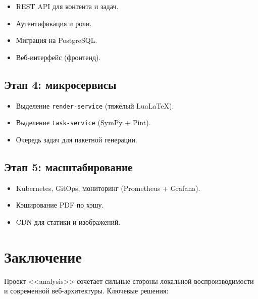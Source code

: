 \documentclass[12pt,a4paper]{article}
\newcommand{\code}[1]{\texttt{#1}}
\begin{document}
\begin{itemize}
    \item REST API для контента и задач.
    \item Аутентификация и роли.
    \item Миграция на PostgreSQL.
    \item Веб-интерфейс (фронтенд).
\end{itemize}

\subsection{Этап 4: микросервисы}

\begin{itemize}
    \item Выделение \code{render-service} (тяжёлый LuaLaTeX).
    \item Выделение \code{task-service} (SymPy + Pint).
    \item Очередь задач для пакетной генерации.
\end{itemize}

\subsection{Этап 5: масштабирование}

\begin{itemize}
    \item Kubernetes, GitOps, мониторинг (Prometheus + Grafana).
    \item Кэширование PDF по хэшу.
    \item CDN для статики и изображений.
\end{itemize}

\section{Заключение}

Проект <<analysis>> сочетает сильные стороны локальной
воспроизводимости и современной веб-архитектуры. Ключевые решения:
\end{document}
